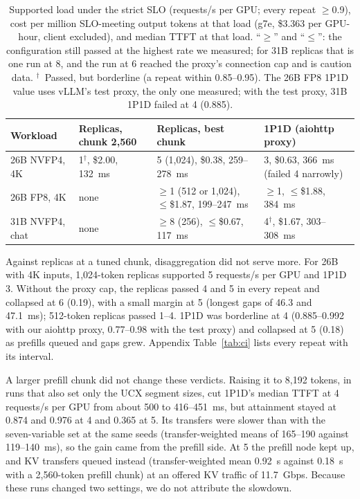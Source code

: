 \documentclass[11pt]{article}
\begin{document}
\begin{table}[!htbp]
\centering\small
\begin{tabularx}{\linewidth}{lLLL}
\toprule
Workload & Replicas, chunk 2,560 & Replicas, best chunk & 1P1D (aiohttp proxy) \\
\midrule
26B NVFP4, 4K & 1$^\dagger$, \$2.00, 132~ms & 5 (1,024), \$0.38, 259--278~ms & 3, \$0.63, 366~ms (failed 4 narrowly) \\
26B FP8, 4K & none & $\ge$1 (512 or 1,024), $\le$\$1.87, 199--247~ms & $\ge$1, $\le$\$1.88, 384~ms \\
31B NVFP4, chat & none & $\ge$8 (256), $\le$\$0.67, 117~ms & 4$^\dagger$, \$1.67, 303--308~ms \\
\bottomrule
\end{tabularx}
\caption{Supported load under the strict SLO (requests/s per GPU; every repeat $\ge$0.9), cost per million SLO-meeting output tokens at that load (g7e, \$3.363 per GPU-hour, client excluded), and median TTFT at that load. ``$\ge$'' and ``$\le$'': the configuration still passed at the highest rate we measured; for 31B replicas that is one run at 8, and the run at 6 reached the proxy's connection cap and is caution data. $^\dagger$~Passed, but borderline (a repeat within 0.85--0.95). The 26B FP8 1P1D value uses vLLM's test proxy, the only one measured; with the test proxy, 31B 1P1D failed at 4 (0.885).}
\label{tab:cost}
\end{table}

Against replicas at a tuned chunk, disaggregation did not serve more. For 26B with 4K inputs, 1,024-token replicas supported 5 requests/s per GPU and 1P1D 3. Without the proxy cap, the replicas passed 4 and 5 in every repeat and collapsed at 6 (0.19), with a small margin at 5 (longest gaps of 46.3 and 47.1~ms); 512-token replicas passed 1--4. 1P1D was borderline at 4 (0.885--0.992 with our aiohttp proxy, 0.77--0.98 with the test proxy) and collapsed at 5 (0.18) as prefills queued and gaps grew. Appendix Table~\ref{tab:ci} lists every repeat with its interval.

A larger prefill chunk did not change these verdicts. Raising it to 8,192 tokens, in runs that also set only the UCX segment sizes, cut 1P1D's median TTFT at 4 requests/s per GPU from about 500 to 416--451~ms, but attainment stayed at 0.874 and 0.976 at 4 and 0.365 at 5. Its transfers were slower than with the seven-variable set at the same seeds (transfer-weighted means of 165--190 against 119--140~ms), so the gain came from the prefill side. At 5 the prefill node kept up, and KV transfers queued instead (transfer-weighted mean 0.92~s against 0.18~s with a 2,560-token prefill chunk) at an offered KV traffic of 11.7~Gbps. Because these runs changed two settings, we do not attribute the slowdown.
\end{document}

